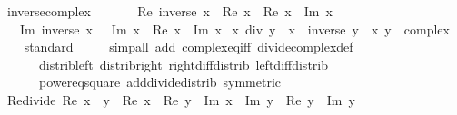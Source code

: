 \begin{isabellebody}
\isanewline
{}\isamarkupfalse%
\ inverse{\isacharunderscore}{\kern0pt}complex\isanewline
\ \ \isanewline
\ \ \ \ {\isachardoublequoteopen}Re\ {\isacharparenleft}{\kern0pt}inverse\ x{\isacharparenright}{\kern0pt}\ {\isacharequal}{\kern0pt}\ Re\ x\ {\isacharslash}{\kern0pt}\ {\isacharparenleft}{\kern0pt}{\isacharparenleft}{\kern0pt}Re\ x{\isacharparenright}{\kern0pt}\ {\isacharplus}{\kern0pt}\ {\isacharparenleft}{\kern0pt}Im\ x{\isacharparenright}{\kern0pt}\isanewline
\ \ {\isacharbar}{\kern0pt}\ {\isachardoublequoteopen}Im\ {\isacharparenleft}{\kern0pt}inverse\ x{\isacharparenright}{\kern0pt}\ {\isacharequal}{\kern0pt}\ {\isacharminus}{\kern0pt}\ Im\ x\ {\isacharslash}{\kern0pt}\ {\isacharparenleft}{\kern0pt}{\isacharparenleft}{\kern0pt}Re\ x{\isacharparenright}{\kern0pt}\ {\isacharplus}{\kern0pt}\ {\isacharparenleft}{\kern0pt}Im\ x{\isacharparenright}{\kern0pt}\isanewline
\isanewline
{}\isamarkupfalse%
\ {\isachardoublequoteopen}x\ div\ y\ {\isacharequal}{\kern0pt}\ x\ {\isacharasterisk}{\kern0pt}\ inverse\ y{\isachardoublequoteclose}\ \ x\ y\ {\isacharcolon}{\kern0pt}{\isacharcolon}{\kern0pt}\ complex\isanewline
\isanewline
{}\isamarkupfalse%
\isanewline
%
\isadelimproof
\ \ %
\endisadelimproof
%
\isatagproof
{}\isamarkupfalse%
\ standard\isanewline
\ \ \ \ \ {\isacharparenleft}{\kern0pt}simp{\isacharunderscore}{\kern0pt}all\ add{\isacharcolon}{\kern0pt}\ complex{\isacharunderscore}{\kern0pt}eq{\isacharunderscore}{\kern0pt}iff\ divide{\isacharunderscore}{\kern0pt}complex{\isacharunderscore}{\kern0pt}def\isanewline
\ \ \ \ \ \ distrib{\isacharunderscore}{\kern0pt}left\ distrib{\isacharunderscore}{\kern0pt}right\ right{\isacharunderscore}{\kern0pt}diff{\isacharunderscore}{\kern0pt}distrib\ left{\isacharunderscore}{\kern0pt}diff{\isacharunderscore}{\kern0pt}distrib\isanewline
\ \ \ \ \ \ power{}{\isacharunderscore}{\kern0pt}eq{\isacharunderscore}{\kern0pt}square\ add{\isacharunderscore}{\kern0pt}divide{\isacharunderscore}{\kern0pt}distrib\ {\isacharbrackleft}{\kern0pt}symmetric{\isacharbrackright}{\kern0pt}{\isacharparenright}{\kern0pt}%
\endisatagproof
{\isafoldproof}%
%
\isadelimproof
\isanewline
%
\endisadelimproof
\isanewline
{}\isamarkupfalse%
\isanewline
\isanewline
{}\isamarkupfalse%
\ Re{\isacharunderscore}{\kern0pt}divide{\isacharcolon}{\kern0pt}\ {\isachardoublequoteopen}Re\ {\isacharparenleft}{\kern0pt}x\ {\isacharslash}{\kern0pt}\ y{\isacharparenright}{\kern0pt}\ {\isacharequal}{\kern0pt}\ {\isacharparenleft}{\kern0pt}Re\ x\ {\isacharasterisk}{\kern0pt}\ Re\ y\ {\isacharplus}{\kern0pt}\ Im\ x\ {\isacharasterisk}{\kern0pt}\ Im\ y{\isacharparenright}{\kern0pt}\ {\isacharslash}{\kern0pt}\ {\isacharparenleft}{\kern0pt}{\isacharparenleft}{\kern0pt}Re\ y{\isacharparenright}{\kern0pt}\ {\isacharplus}{\kern0pt}\ {\isacharparenleft}{\kern0pt}Im\ y{\isacharparenright}{\kern0pt}\isanewline

\end{isabellebody}
